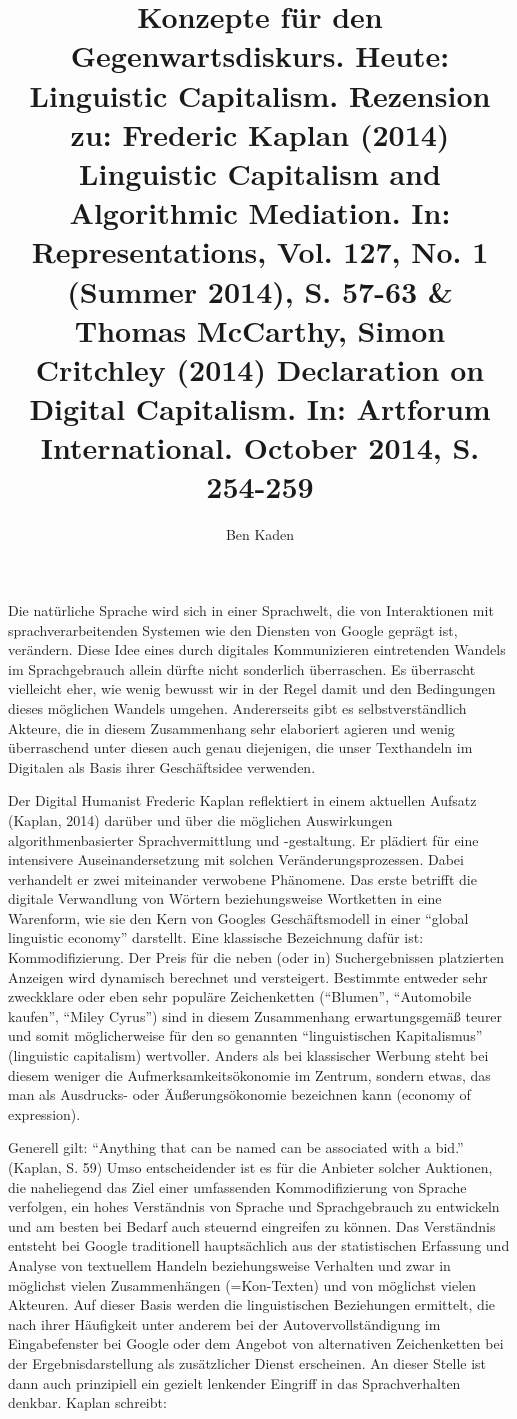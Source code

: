 \documentclass[a4paper,
fontsize=11pt,
oneside,
numbers=noperiodatend,
parskip=half-,
bibliography=totoc,
final
]{scrartcl}
\title{\LARGE{Konzepte für den Gegenwartsdiskurs. Heute: Linguistic Capitalism. Rezension zu: Frederic Kaplan (2014) Linguistic Capitalism and Algorithmic Mediation. In: Representations, Vol. 127, No. 1 (Summer 2014), S. 57-63 \& Thomas McCarthy, Simon Critchley (2014) Declaration on Digital Capitalism. In: Artforum International. October 2014, S. 254-259}} %
\author{Ben Kaden} %
\date{}
\begin{document}
\maketitle
\thispagestyle{fancyplain} 


Die natürliche Sprache wird sich in einer Sprachwelt, die von
Interaktionen mit sprachverarbeitenden Systemen wie den Diensten von
Google geprägt ist, verändern. Diese Idee eines durch digitales
Kommunizieren eintretenden Wandels im Sprachgebrauch allein dürfte nicht
sonderlich überraschen. Es überrascht vielleicht eher, wie wenig bewusst
wir in der Regel damit und den Bedingungen dieses möglichen Wandels
umgehen. Andererseits gibt es selbstverständlich Akteure, die in diesem
Zusammenhang sehr elaboriert agieren und wenig überraschend unter diesen
auch genau diejenigen, die unser Texthandeln im Digitalen als Basis
ihrer Geschäftsidee verwenden.

Der Digital Humanist Frederic Kaplan reflektiert in einem aktuellen
Aufsatz (Kaplan, 2014) darüber und über die möglichen Auswirkungen
algorithmenbasierter Sprachvermittlung und -gestaltung. Er plädiert für
eine intensivere Auseinandersetzung mit solchen Veränderungsprozessen.
Dabei verhandelt er zwei miteinander verwobene Phänomene. Das erste
betrifft die digitale Verwandlung von Wörtern beziehungsweise Wortketten
in eine Warenform, wie sie den Kern von Googles Geschäftsmodell in einer
\enquote{global linguistic economy} darstellt. Eine klassische
Bezeichnung dafür ist: Kommodifizierung. Der Preis für die neben (oder
in) Suchergebnissen platzierten Anzeigen wird dynamisch berechnet und
versteigert. Bestimmte entweder sehr zweckklare oder eben sehr populäre
Zeichenketten (\enquote{Blumen}, \enquote{Automobile kaufen},
\enquote{Miley Cyrus}) sind in diesem Zusammenhang erwartungsgemäß
teurer und somit möglicherweise für den so genannten
\enquote{linguistischen Kapitalismus} (linguistic capitalism)
wertvoller. Anders als bei klassischer Werbung steht bei diesem weniger
die Aufmerksamkeitsökonomie im Zentrum, sondern etwas, das man als
Ausdrucks- oder Äußerungsökonomie bezeichnen kann (economy of
expression).

Generell gilt: \enquote{Anything that can be named can be associated
with a bid.} (Kaplan, S. 59) Umso entscheidender ist es für die Anbieter
solcher Auktionen, die naheliegend das Ziel einer umfassenden
Kommodifizierung von Sprache verfolgen, ein hohes Verständnis von
Sprache und Sprachgebrauch zu entwickeln und am besten bei Bedarf auch
steuernd eingreifen zu können. Das Verständnis entsteht bei Google
traditionell hauptsächlich aus der statistischen Erfassung und Analyse
von textuellem Handeln beziehungsweise Verhalten und zwar in möglichst
vielen Zusammenhängen (=Kon-Texten) und von möglichst vielen Akteuren.
Auf dieser Basis werden die linguistischen Beziehungen ermittelt, die
nach ihrer Häufigkeit unter anderem bei der Autovervollständigung im
Eingabefenster bei Google oder dem Angebot von alternativen
Zeichenketten bei der Ergebnisdarstellung als zusätzlicher Dienst
erscheinen. An dieser Stelle ist dann auch prinzipiell ein gezielt
lenkender Eingriff in das Sprachverhalten denkbar. Kaplan schreibt:
\end{document}
